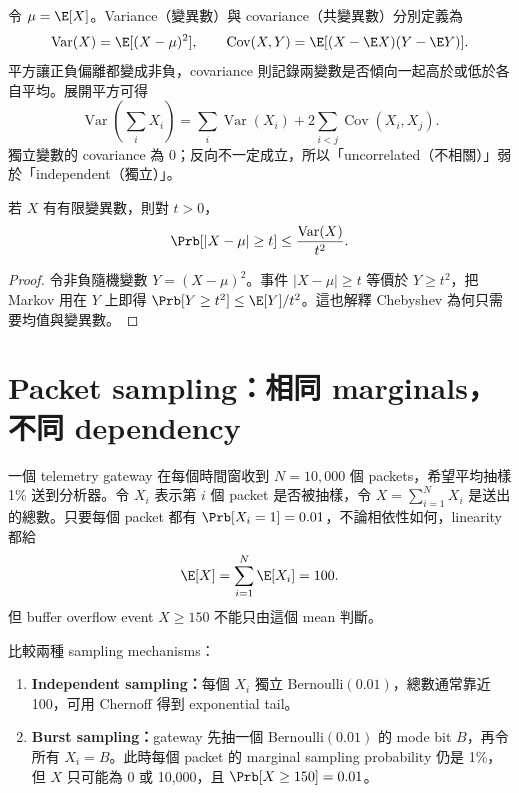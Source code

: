 \documentclass[11pt,a4paper,oneside,openany]{book}
\begin{document}
令 $\mu=\E[X]$。Variance（變異數）與 covariance（共變異數）分別定義為
\[
 \operatorname{Var}(X)=\E[(X-\mu)^2],\qquad
 \operatorname{Cov}(X,Y)=\E[(X-\E X)(Y-\E Y)].
\]
平方讓正負偏離都變成非負，covariance 則記錄兩變數是否傾向一起高於或低於各自平均。展開平方可得
\begin{equation}
 \operatorname{Var}\!\left(\sum_iX_i\right)
 =\sum_i\operatorname{Var}(X_i)
 +2\sum_{i<j}\operatorname{Cov}(X_i,X_j).                \label{eq:variance-sum}
\end{equation}
獨立變數的 covariance 為 0；反向不一定成立，所以「uncorrelated（不相關）」弱於「independent（獨立）」。

\begin{theorem}
若 $X$ 有有限變異數，則對 $t>0$，
\[
 \Prb[|X-\mu|\ge t]
 \le\frac{\operatorname{Var}(X)}{t^2}.
\]
\end{theorem}
\begin{proof}
令非負隨機變數 $Y=(X-\mu)^2$。事件 $|X-\mu|\ge t$ 等價於 $Y\ge t^2$，把 Markov 用在 $Y$ 上即得
\(
 \Prb[Y\ge t^2]\le\E[Y]/t^2
\)。這也解釋 Chebyshev 為何只需要均值與變異數。
\end{proof}

\section{Packet sampling：相同 marginals，不同 dependency}
一個 telemetry gateway 在每個時間窗收到 $N=10{,}000$ 個 packets，希望平均抽樣 1\% 送到分析器。令 $X_i$ 表示第 $i$ 個 packet 是否被抽樣，令 $X=\sum_{i=1}^N X_i$ 是送出的總數。只要每個 packet 都有 $\Prb[X_i=1]=0.01$，不論相依性如何，linearity 都給
\[
 \E[X]=\sum_{i=1}^{N}\E[X_i]=100.
\]
但 buffer overflow event $X\ge150$ 不能只由這個 mean 判斷。

比較兩種 sampling mechanisms：
\begin{enumerate}
\item \textbf{Independent sampling：}每個 $X_i$ 獨立 Bernoulli$(0.01)$，總數通常靠近 100，可用 Chernoff 得到 exponential tail。
\item \textbf{Burst sampling：}gateway 先抽一個 Bernoulli$(0.01)$ 的 mode bit $B$，再令所有 $X_i=B$。此時每個 packet 的 marginal sampling probability 仍是 1\%，但 $X$ 只可能為 0 或 10,000，且 $\Prb[X\ge150]=0.01$。
\end{enumerate}
\end{document}
